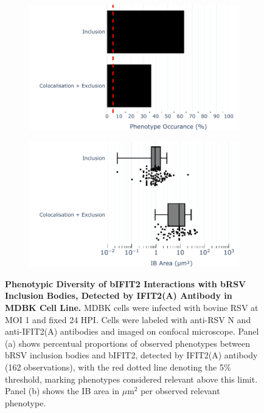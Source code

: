 \begin{figure}
    \begin{subfigure}{0.495\textwidth}
        \caption{}
        \includegraphics[width=1\linewidth]{08. Chapter 3/Figs/02. Infection/02. IFIT2/01. IFIT2A/13. bar_i2a_mdbk.pdf} 
    \end{subfigure}
    \begin{subfigure}{0.495\textwidth}
        \caption{}
        \includegraphics[width=1\linewidth]{08. Chapter 3/Figs/02. Infection/02. IFIT2/01. IFIT2A/14. box_i2a_mdbk.pdf}
    \end{subfigure}
    \caption[Phenotypic Diversity of bIFIT2 Interactions with bRSV Inclusion Bodies, Detected by IFIT2(A) Antibody in MDBK Cell Line.]{\textbf{Phenotypic Diversity of bIFIT2 Interactions with bRSV Inclusion Bodies, Detected by IFIT2(A) Antibody in MDBK Cell Line.} MDBK cells were infected with bovine RSV at MOI 1 and fixed 24 HPI. Cells were labeled with anti-RSV N and anti-IFIT2(A) antibodies and imaged on confocal microscope. Panel (a) shows percentual proportions of observed phenotypes between bRSV inclusion bodies and bIFIT2, detected by IFIT2(A) antibody (162 observations), with the red dotted line denoting the 5\% threshold, marking phenotypes considered relevant above this limit. Panel (b) shows the IB area in \(\mu \mbox{m}^2\) per observed relevant phenotype.}
    \label{fig:Phenotypic Diversity of bIFIT2 Interactions with bRSV Inclusion Bodies, Detected by IFIT2(A) Antibody in MDBK Cell Line}
\end{figure}

